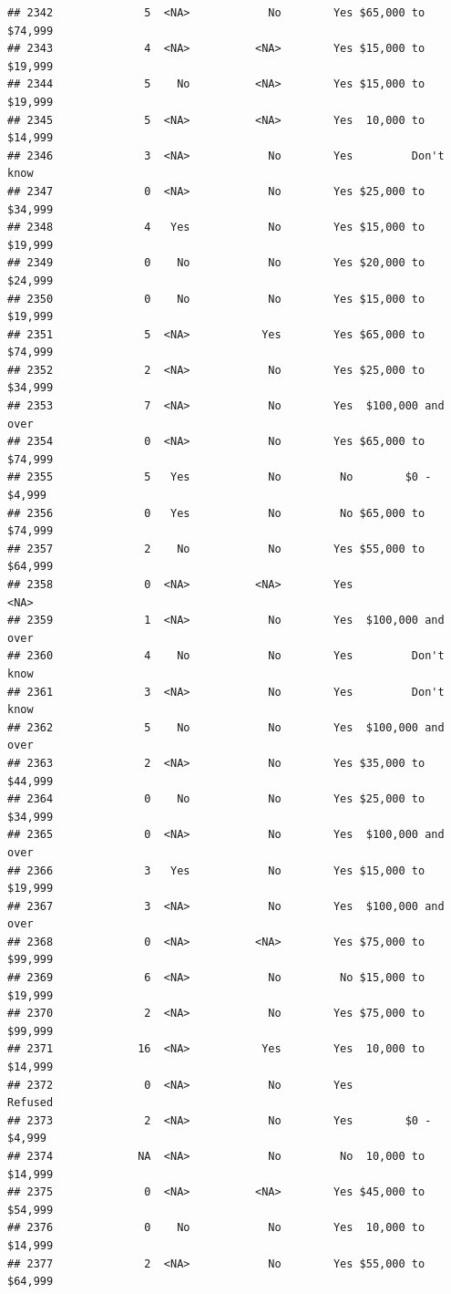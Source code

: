 \documentclass[man]{apa6}
\begin{document}
\begin{verbatim}
## 2342              5  <NA>            No        Yes $65,000 to $74,999
## 2343              4  <NA>          <NA>        Yes $15,000 to $19,999
## 2344              5    No          <NA>        Yes $15,000 to $19,999
## 2345              5  <NA>          <NA>        Yes  10,000 to $14,999
## 2346              3  <NA>            No        Yes         Don't know
## 2347              0  <NA>            No        Yes $25,000 to $34,999
## 2348              4   Yes            No        Yes $15,000 to $19,999
## 2349              0    No            No        Yes $20,000 to $24,999
## 2350              0    No            No        Yes $15,000 to $19,999
## 2351              5  <NA>           Yes        Yes $65,000 to $74,999
## 2352              2  <NA>            No        Yes $25,000 to $34,999
## 2353              7  <NA>            No        Yes  $100,000 and over
## 2354              0  <NA>            No        Yes $65,000 to $74,999
## 2355              5   Yes            No         No        $0 - $4,999
## 2356              0   Yes            No         No $65,000 to $74,999
## 2357              2    No            No        Yes $55,000 to $64,999
## 2358              0  <NA>          <NA>        Yes               <NA>
## 2359              1  <NA>            No        Yes  $100,000 and over
## 2360              4    No            No        Yes         Don't know
## 2361              3  <NA>            No        Yes         Don't know
## 2362              5    No            No        Yes  $100,000 and over
## 2363              2  <NA>            No        Yes $35,000 to $44,999
## 2364              0    No            No        Yes $25,000 to $34,999
## 2365              0  <NA>            No        Yes  $100,000 and over
## 2366              3   Yes            No        Yes $15,000 to $19,999
## 2367              3  <NA>            No        Yes  $100,000 and over
## 2368              0  <NA>          <NA>        Yes $75,000 to $99,999
## 2369              6  <NA>            No         No $15,000 to $19,999
## 2370              2  <NA>            No        Yes $75,000 to $99,999
## 2371             16  <NA>           Yes        Yes  10,000 to $14,999
## 2372              0  <NA>            No        Yes            Refused
## 2373              2  <NA>            No        Yes        $0 - $4,999
## 2374             NA  <NA>            No         No  10,000 to $14,999
## 2375              0  <NA>          <NA>        Yes $45,000 to $54,999
## 2376              0    No            No        Yes  10,000 to $14,999
## 2377              2  <NA>            No        Yes $55,000 to $64,999

\end{verbatim}
\end{document}

